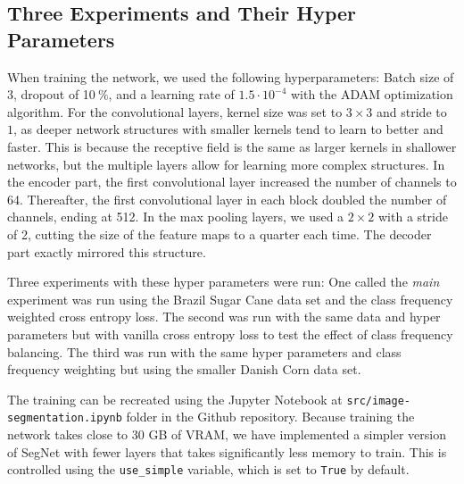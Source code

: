 \documentclass{article}
\newcommand{\pro}{\ensuremath{\ \%}}
\begin{document}
\subsection{Three Experiments and Their Hyper Parameters}
When training the network, we used the following hyperparameters: Batch size of 3, dropout of 10\pro, and a learning rate of $ 1.5\cdot 10^{-4} $ with the ADAM optimization algorithm.
For the convolutional layers, kernel size was set to $ 3\times 3 $ and stride to $ 1 $, as deeper network structures with smaller kernels tend to learn to better and faster.
This is because the receptive field is the same as larger kernels in shallower networks, but the multiple layers allow for learning more complex structures.
In the encoder part, the first convolutional layer increased the number of channels to 64.
Thereafter, the first convolutional layer in each block doubled the number of channels, ending at 512.
In the max pooling layers, we used a $ 2\times 2 $ with a stride of 2, cutting the size of the feature maps to a quarter each time.
The decoder part exactly mirrored this structure.

Three experiments with these hyper parameters were run: One called the \textit{main} experiment was run using the Brazil Sugar Cane data set and the class frequency weighted cross entropy loss.  The second was run with the same data and hyper parameters but with vanilla cross entropy loss to test the effect of class frequency balancing. The third was run with the same hyper parameters and class frequency weighting but using the smaller Danish Corn data set.

The training can be recreated using the Jupyter Notebook at \texttt{src/image-segmentation.ipynb} folder in the Github repository.
Because training the network takes close to 30 GB of VRAM, we have implemented a simpler version of SegNet with fewer layers that takes significantly less memory to train.
This is controlled using the \texttt{use\_simple} variable, which is set to \texttt{True} by default.
\end{document}
